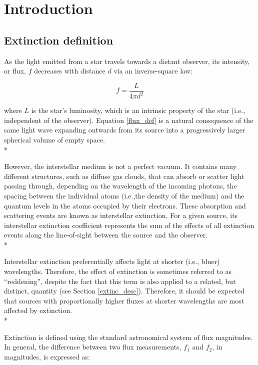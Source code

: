 \documentclass[12pt, a4paper]{report}
\begin{document}
\chapter{Introduction}
\section{Extinction definition}

As the light emitted from a star travels towards a distant observer, its intensity, or flux, $f$ decreases with distance $d$ via an inverse-square law:

\begin{equation}
\label{flux_def}
f = \frac{L}{4 \pi d^{2}}
\end{equation}

where $L$ is the star's luminosity, which is an intrinsic property of the star (i.e., independent of the observer). Equation \ref{flux_def} is a natural consequence of the same light wave expanding outwards from its source into a progressively larger spherical volume of empty space. \\*

However, the interstellar medium is not a perfect vacuum. It contains many different structures, such as diffuse gas clouds, that can absorb or scatter light passing through, depending on the wavelength of the incoming photons, the spacing between the individual atoms (i.e.,the density of the medium) and the quantum levels in the atoms occupied by their electrons. These absorption and scattering events are known as interstellar extinction. For a given source, its interstellar extinction coefficient represents the sum of the effects of all extinction events along the line-of-sight between the source and the observer. \\*

Interstellar extinction preferentially affects light at shorter (i.e., bluer) wavelengths. Therefore, the effect of extinction is sometimes referred to as ``reddening'', despite the fact that this term is also applied to a related, but distinct, quantity (see Section \ref{extinc_desc}). Therefore, it should be expected that sources with proportionally higher fluxes at shorter wavelengths are most affected by extinction. \\*

Extinction is defined using the standard astronomical system of flux magnitudes. In general, the difference between two flux measurements, $f_{1}$ and $f_{2}$, in magnitudes, is expressed as:
\end{document}
